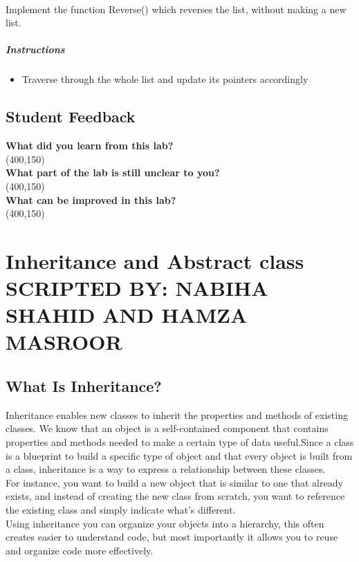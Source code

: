 \documentclass[11pt,fleqn]{book} %
\begin{document}
~\\
\begin{problem}
	Implement the function Reverse() which reverses the list, without making a new list.
	\paragraph{Instructions}
	\begin{itemize}
		\item Traverse through the whole list and update its pointers accordingly
	\end{itemize}
\end{problem}

\newpage
 \section{Student Feedback}
 \textbf{What did you learn from this lab?}\\ 
 \framebox(400,150){}\\
 \textbf{What part of the lab is still unclear to you?}\\
 \framebox(400,150){}\\
 \textbf{What can be improved in this lab?}\\ 
 \framebox(400,150){}\\


\newpage


\chapter{Inheritance and Abstract class\hspace{4mm} {\textsc{\small SCRIPTED BY: NABIHA SHAHID AND HAMZA MASROOR}}}

\section{What Is Inheritance?}

Inheritance enables new classes to inherit the properties and methods of existing classes. We know that an object is a self-contained component that contains properties and methods needed to make a certain type of data useful.Since a class is a blueprint to build a specific type of object and that every object is built from a class, inheritance is a way to express a relationship between these classes.\\
For instance, you want to build a new object that is similar to one that already exists, and instead of creating the new class from scratch, you want to reference the existing class and simply indicate what's different.\\
Using inheritance you can organize your objects into a hierarchy, this often creates easier to understand code, but most importantly it allows you to reuse and organize code more effectively.
\end{document}
